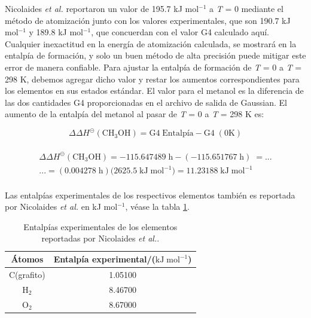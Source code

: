 Nicolaides \textit{et al.} \cite{Nicolaides1996} reportaron un valor de 195.7 kJ mol$^{-1}$ a \textit{T} = 0 mediante el método de atomización junto con los valores experimentales, que son 190.7 kJ mol$^{-1}$ y 189.8 kJ mol$^{-1}$, que concuerdan con el valor G4 calculado aquí. Cualquier inexactitud en la energía de atomización calculada, se mostrará en la entalpía de formación, y solo un buen método de alta precisión puede mitigar este error de manera confiable. Para ajustar la entalpía de formación de \textit{T} = 0 a \textit{T} = 298 K, debemos agregar dicho valor y restar los aumentos correspondientes para los elementos en sus estados estándar. El valor para el metanol es la diferencia de las dos cantidades G4 proporcionadas en el archivo de salida de Gaussian. El aumento de la entalpía del metanol al pasar de \textit{T} = 0 a \textit{T} = 298 K es:


\begin{equation}
	\Delta \Delta H^{\circleddash}(\mathrm{CH_3OH}) = \mathrm{G4}\;\textrm{Entalpía} - \mathrm{G4} \;(0\mathrm{K})
\label{eq:3.19}
\end{equation}\\

\begin{multline}
	\Delta \Delta H^{\circleddash}\mathrm{(CH_3OH)} = -115.647489\;\mathrm{h} - (-115.651767\;\mathrm{h})\; =...\\
	...= (0.004278\;\mathrm{h})(2625.5\;\mathrm{kJ\;mol^{-1})} = 11.23188\;\mathrm{kJ\;mol^{-1}}
\label{eq:3.20}
\end{multline}\\

Las entalpías experimentales de los respectivos elementos también es reportada por Nicolaides \textit{et al.}\cite{Nicolaides1996} en kJ mol$^{-1}$, véase la tabla \ref{Nicolaides-exp-table}.

\begin{table}[H]
\begin{center}
\begin{tabular}{||c|c||}
\hline 
	Átomos  & Entalpía experimental/($\mathrm{kJ\;mol^{-1}}$) \\ 
\hline 
C(grafito) & 1.05100 \\ 
\hline 
H$_{2}$ & 8.46700 \\ 
\hline 
O$_{2}$ & 8.67000 \\ 
\hline 
\end{tabular}
	\caption{Entalpías experimentales de los elementos reportadas por Nicolaides \textit{et al.}\cite{Nicolaides1996}.}
\label{Nicolaides-exp-table}
\end{center}
\end{table}

